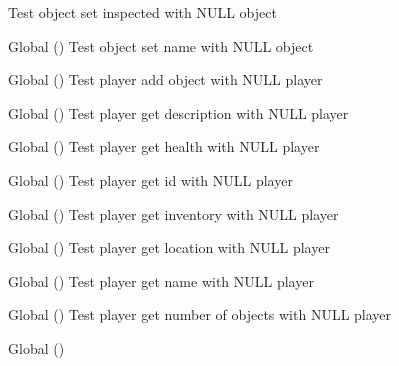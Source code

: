 \begin{DoxyRefList}
%
Test object set inspected with NULL object  
\item[Global \doxylink{object__test_8c_acf42b7e7be91ede243f2aaa56c4c9347}{test2\+\_\+object\+\_\+set\+\_\+name} ()]\label{test__test000086}%
%
Test object set name with NULL object  
\item[Global \doxylink{player__test_8c_a864d3935cf61953950b10df0e656306d}{test2\+\_\+player\+\_\+add\+\_\+object} ()]\label{test__test000135}%
%
Test player add object with NULL player  
\item[Global \doxylink{player__test_8c_a938f3fe4f38a162584c47f1e1c85c75d}{test2\+\_\+player\+\_\+get\+\_\+description} ()]\label{test__test000115}%
%
Test player get description with NULL player  
\item[Global \doxylink{player__test_8c_a0d0d1c26e649578825cab7206d78b5c5}{test2\+\_\+player\+\_\+get\+\_\+health} ()]\label{test__test000109}%
%
Test player get health with NULL player  
\item[Global \doxylink{player__test_8c_a9fa80f0c0e46b45eb9f1685b102a5826}{test2\+\_\+player\+\_\+get\+\_\+id} ()]\label{test__test000101}%
%
Test player get id with NULL player  
\item[Global \doxylink{player__test_8c_a8f3a62c708fbed848568841ca8b1cd26}{test2\+\_\+player\+\_\+get\+\_\+inventory} ()]\label{test__test000119}%
%
Test player get inventory with NULL player  
\item[Global \doxylink{player__test_8c_a4c5605fac4bd716e1dfb2744db4fa8a1}{test2\+\_\+player\+\_\+get\+\_\+location} ()]\label{test__test000123}%
%
Test player get location with NULL player  
\item[Global \doxylink{player__test_8c_a3aa908fd360b74e7786422260e8e16a0}{test2\+\_\+player\+\_\+get\+\_\+name} ()]\label{test__test000105}%
%
Test player get name with NULL player  
\item[Global \doxylink{player__test_8c_af795956906ac0779f168e882288257c8}{test2\+\_\+player\+\_\+get\+\_\+num\+\_\+objects} ()]\label{test__test000129}%
%
Test player get number of objects with NULL player  
\item[Global \doxylink{player__test_8c_aae715732b4bd9e99580340c109518d7e}{test2\+\_\+player\+\_\+get\+\_\+object\+\_\+from\+\_\+index} ()]\label{test__test000127}%

\end{DoxyRefList}
